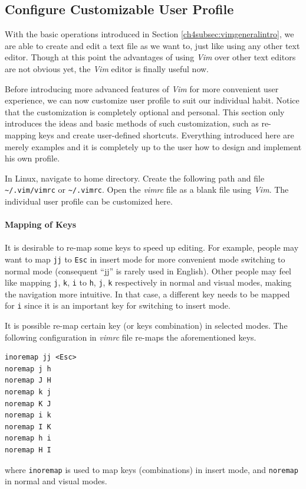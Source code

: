 \subsection{Configure Customizable User Profile}

With the basic operations introduced in Section \ref{ch4subsec:vimgeneralintro}, we are able to create and edit a text file as we want to, just like using any other text editor. Though at this point the advantages of using \textit{Vim} over other text editors are not obvious yet, the \textit{Vim} editor is finally useful now.

Before introducing more advanced features of \textit{Vim} for more convenient user experience, we can now customize user profile to suit our individual habit. Notice that the customization is completely optional and personal. This section only introduces the ideas and basic methods of such customization, such as re-mapping keys and create user-defined shortcuts. Everything introduced here are merely examples and it is completely up to the user how to design and implement his own profile.

In Linux, navigate to home directory. Create the following path and file \verb|~/.vim/vimrc| or \verb|~/.vimrc|. Open the \textit{vimrc} file as a blank file using \textit{Vim}. The individual user profile can be customized here.
\\
\\
\noindent \textbf{Mapping of Keys}
\\
\\
It is desirable to re-map some keys to speed up editing. For example, people may want to map \verb|jj| to \verb|Esc| in insert mode for more convenient mode switching to normal mode (consequent ``jj'' is rarely used in English). Other people may feel like mapping \verb|j|, \verb|k|, \verb|i| to \verb|h|, \verb|j|, \verb|k| respectively in normal and visual modes, making the navigation more intuitive. In that case, a different key needs to be mapped for \verb|i| since it is an important key for switching to insert mode.

It is possible re-map certain key (or keys combination) in selected modes. The following configuration in \textit{vimrc} file re-maps the aforementioned keys.
\begin{verbatim}
inoremap jj <Esc>
noremap j h
noremap J H
noremap k j
noremap K J
noremap i k
noremap I K
noremap h i
noremap H I
\end{verbatim}
where \verb|inoremap| is used to map keys (combinations) in insert mode, and \verb|noremap| in normal and visual modes.

